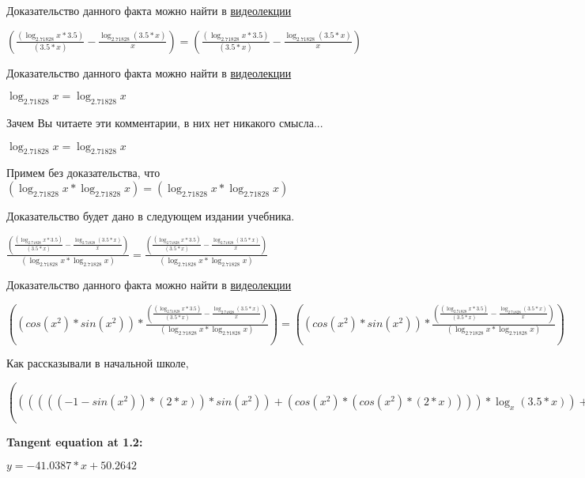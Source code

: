 \documentclass[12pt,a4paper,fleqn]{article}
\theoremstyle{definition}
\begin{document}
Доказательство данного факта можно найти в \href{https://www.youtube.com/watch?v=dQw4w9WgXcQ}{видеолекции}

$(\frac{(\log_{ 2.71828 }{ x } *  3.5 )}{( 3.5  *  x )}
 - \frac{\log_{ 2.71828 }{( 3.5  *  x )}}{ x }
) = (\frac{(\log_{ 2.71828 }{ x } *  3.5 )}{( 3.5  *  x )}
 - \frac{\log_{ 2.71828 }{( 3.5  *  x )}}{ x }
)$

Доказательство данного факта можно найти в \href{https://www.youtube.com/watch?v=dQw4w9WgXcQ}{видеолекции}

$\log_{ 2.71828 }{ x } = \log_{ 2.71828 }{ x }$

Зачем Вы читаете эти комментарии, в них нет никакого смысла...

$\log_{ 2.71828 }{ x } = \log_{ 2.71828 }{ x }$

Примем без доказательства, что
$(\log_{ 2.71828 }{ x } * \log_{ 2.71828 }{ x }) = (\log_{ 2.71828 }{ x } * \log_{ 2.71828 }{ x })$

Доказательство будет дано в следующем издании учебника.

$\frac{(\frac{(\log_{ 2.71828 }{ x } *  3.5 )}{( 3.5  *  x )}
 - \frac{\log_{ 2.71828 }{( 3.5  *  x )}}{ x }
)}{(\log_{ 2.71828 }{ x } * \log_{ 2.71828 }{ x })}
 = \frac{(\frac{(\log_{ 2.71828 }{ x } *  3.5 )}{( 3.5  *  x )}
 - \frac{\log_{ 2.71828 }{( 3.5  *  x )}}{ x }
)}{(\log_{ 2.71828 }{ x } * \log_{ 2.71828 }{ x })}
$

Доказательство данного факта можно найти в \href{https://www.youtube.com/watch?v=dQw4w9WgXcQ}{видеолекции}

$((cos({ x }^{ 2 }) * sin({ x }^{ 2 })) * \frac{(\frac{(\log_{ 2.71828 }{ x } *  3.5 )}{( 3.5  *  x )}
 - \frac{\log_{ 2.71828 }{( 3.5  *  x )}}{ x }
)}{(\log_{ 2.71828 }{ x } * \log_{ 2.71828 }{ x })}
) = ((cos({ x }^{ 2 }) * sin({ x }^{ 2 })) * \frac{(\frac{(\log_{ 2.71828 }{ x } *  3.5 )}{( 3.5  *  x )}
 - \frac{\log_{ 2.71828 }{( 3.5  *  x )}}{ x }
)}{(\log_{ 2.71828 }{ x } * \log_{ 2.71828 }{ x })}
)$

Как рассказывали в начальной школе,

$(((((( -1  - sin({ x }^{ 2 })) * ( 2  *  x )) * sin({ x }^{ 2 })) + (cos({ x }^{ 2 }) * (cos({ x }^{ 2 }) * ( 2  *  x )))) * \log_{ x }{( 3.5  *  x )}) + ((cos({ x }^{ 2 }) * sin({ x }^{ 2 })) * \frac{(\frac{(\log_{ 2.71828 }{ x } *  3.5 )}{( 3.5  *  x )}
 - \frac{\log_{ 2.71828 }{( 3.5  *  x )}}{ x }
)}{(\log_{ 2.71828 }{ x } * \log_{ 2.71828 }{ x })}
)) = (((((( -1  - sin({ x }^{ 2 })) * ( 2  *  x )) * sin({ x }^{ 2 })) + (cos({ x }^{ 2 }) * (cos({ x }^{ 2 }) * ( 2  *  x )))) * \log_{ x }{( 3.5  *  x )}) + ((cos({ x }^{ 2 }) * sin({ x }^{ 2 })) * \frac{(\frac{(\log_{ 2.71828 }{ x } *  3.5 )}{( 3.5  *  x )}
 - \frac{\log_{ 2.71828 }{( 3.5  *  x )}}{ x }
)}{(\log_{ 2.71828 }{ x } * \log_{ 2.71828 }{ x })}
))$


\textbf{Tangent equation at 1.2:}

$y = -41.0387 * x + 50.2642$
\end{document}
